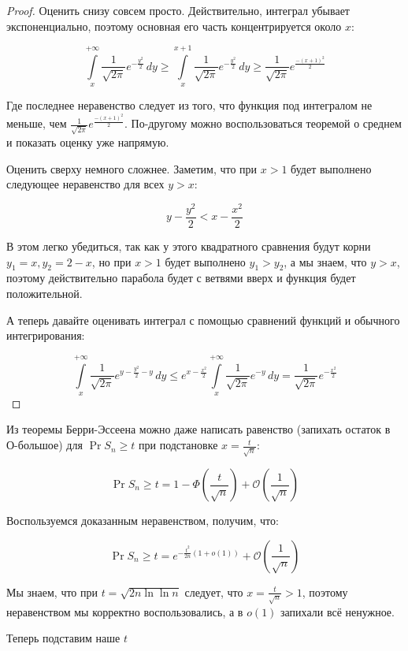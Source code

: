 \begin{proof}
  Оценить снизу совсем просто. Действительно, интеграл убывает экспоненциально,
  поэтому основная его часть концентрируется около $x$:

  \[
    \int\limits_{x}^{+\infty} \frac{1}{\sqrt{2\pi}}e^{-\frac{y^2}{2}}\,dy
    \geq \int\limits_{x}^{x + 1} \frac{1}{\sqrt{2\pi}}e^{-\frac{y^2}{2}}\,dy
    \geq \frac{1}{\sqrt{2\pi}}e^{\frac{-(x + 1)^2}{2}}
  \]

  Где последнее неравенство следует из того, что функция под интегралом не меньше,
  чем $\frac{1}{\sqrt{2\pi}}e^{\frac{-(x + 1)^2}{2}}$. 
  По-другому можно воспользоваться теоремой о среднем и показать оценку уже напрямую.

  Оценить сверху немного сложнее. Заметим, что при $x > 1$ будет выполнено следующее
  неравенство для всех $y > x$:

  \[
    y - \frac{y^2}{2} < x - \frac{x^2}{2}
  \]

  В этом легко убедиться, так как у этого квадратного сравнения будут корни 
  $y_1 = x, y_2 = 2 - x$, но при $x > 1$ будет выполнено $y_1 > y_2$, а мы знаем,
  что $y > x$, поэтому действительно парабола будет с ветвями вверх и функция
  будет положительной.

  А теперь давайте оценивать интеграл с помощью сравнений функций и обычного
  интегрирования:

  \[
     \int\limits_{x}^{+\infty} \frac{1}{\sqrt{2\pi}}e^{y - \frac{y^2}{2} - y}\,dy
     \leq  e^{x - \frac{x^2}{2}}\int\limits_{x}^{+\infty} \frac{1}{\sqrt{2\pi}}e^{-y}\,dy
     = \frac{1}{\sqrt{2\pi}}e^{-\frac{x^2}{2}}
  \]
\end{proof}

Из теоремы Берри-Эссеена можно даже написать равенство (запихать остаток в О-большое)
для $\Pr{S_n \geq t}$ при подстановке $x = \frac{t}{\sqrt{n}}$:

\[
  \Pr{S_n \geq t} = 1 - \Phi\left(\frac{t}{\sqrt{n}}\right) + \mathcal{O}\left(\frac{1}{\sqrt{n}}\right)
\]

Воспользуемся доказанным неравенством, получим, что:

\[
  \Pr{S_n \geq t} = e^{-\frac{t^2}{2n}(1 + o(1))} + \mathcal{O}\left(\frac{1}{\sqrt{n}}\right)
\]

Мы знаем, что при $t = \sqrt{2n\ln\ln n}$ следует, что $x = \frac{t}{\sqrt{n}} > 1$,
поэтому неравенством мы корректно воспользовались, а в $o(1)$ запихали всё ненужное.

Теперь подставим наше $t$

